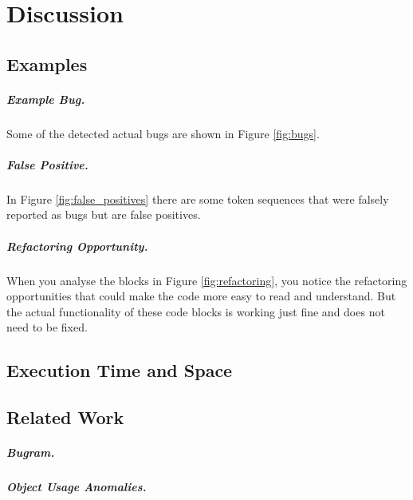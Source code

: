 \chapter{Discussion}\label{chap:discussion}

\section{Examples}

\paragraph{Example Bug.}
Some of the detected actual bugs are shown in Figure \ref{fig:bugs}.
\paragraph{False Positive.}
In Figure \ref{fig:false_positives} there are some token sequences that were falsely reported as bugs but are false positives.
\paragraph{Refactoring Opportunity.}
When you analyse the blocks in Figure \ref{fig:refactoring}, you notice the refactoring opportunities that could make the code more easy to read and understand. But the actual functionality of these code blocks is working just fine and does not need to be fixed.

\section{Execution Time and Space}


\section{Related Work}
\paragraph{Bugram.}
\paragraph{Object Usage Anomalies.}
